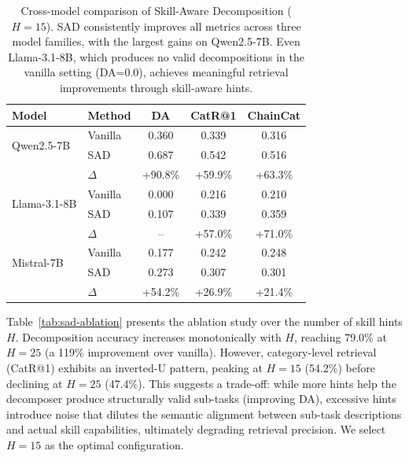 \begin{table}[t]
\centering
\small
\begin{tabular}{llccc}
\toprule
\textbf{Model} & \textbf{Method} & \textbf{DA} & \textbf{CatR@1} & \textbf{ChainCat} \\
\midrule
\multirow{2}{*}{Qwen2.5-7B} & Vanilla & 0.360 & 0.339 & 0.316 \\
 & SAD & 0.687 & 0.542 & 0.516 \\
 & $\Delta$ & \textcolor{green!50!black}{+90.8\%} & \textcolor{green!50!black}{+59.9\%} & \textcolor{green!50!black}{+63.3\%} \\
\midrule
\multirow{2}{*}{Llama-3.1-8B} & Vanilla & 0.000 & 0.216 & 0.210 \\
 & SAD & 0.107 & 0.339 & 0.359 \\
 & $\Delta$ & -- & \textcolor{green!50!black}{+57.0\%} & \textcolor{green!50!black}{+71.0\%} \\
\midrule
\multirow{2}{*}{Mistral-7B} & Vanilla & 0.177 & 0.242 & 0.248 \\
 & SAD & 0.273 & 0.307 & 0.301 \\
 & $\Delta$ & \textcolor{green!50!black}{+54.2\%} & \textcolor{green!50!black}{+26.9\%} & \textcolor{green!50!black}{+21.4\%} \\
\bottomrule
\end{tabular}
\caption{Cross-model comparison of Skill-Aware Decomposition ($H{=}15$). SAD consistently improves all metrics across three model families, with the largest gains on Qwen2.5-7B. Even Llama-3.1-8B, which produces no valid decompositions in the vanilla setting (DA=0.0), achieves meaningful retrieval improvements through skill-aware hints.}
\label{tab:sad-crossmodel}
\end{table}



Table~\ref{tab:sad-ablation} presents the ablation study over the number of skill hints $H$. Decomposition accuracy increases monotonically with $H$, reaching 79.0\% at $H{=}25$ (a 119\% improvement over vanilla). However, category-level retrieval (CatR@1) exhibits an inverted-U pattern, peaking at $H{=}15$ (54.2\%) before declining at $H{=}25$ (47.4\%). This suggests a trade-off: while more hints help the decomposer produce structurally valid sub-tasks (improving DA), excessive hints introduce noise that dilutes the semantic alignment between sub-task descriptions and actual skill capabilities, ultimately degrading retrieval precision. We select $H{=}15$ as the optimal configuration.

